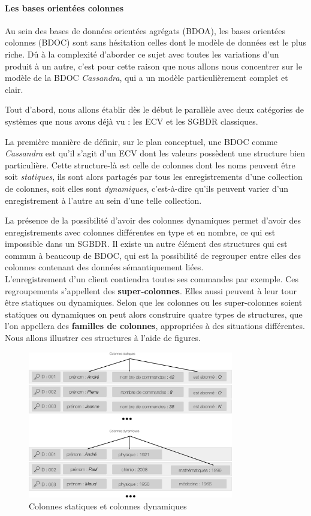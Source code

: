 \documentclass[12pt]{article}
\begin{document}
\paragraph{Les bases orientées colonnes}
Au sein des bases de données orientées agrégats (BDOA), les bases orientées colonnes (BDOC) sont sans hésitation celles dont le modèle de données est le plus riche. Dû à la complexité d'aborder ce sujet avec toutes les variations d'un produit à un autre, c'est pour cette raison que nous allons nous concentrer sur le modèle de la BDOC \emph{Cassandra}, qui a un modèle particulièrement complet et clair. \par
Tout d'abord, nous allons établir dès le début le parallèle avec deux catégories de systèmes que nous avons déjà vu : les ECV et les SGBDR classiques.
\par
La première manière de définir, sur le plan conceptuel, une BDOC comme \emph{Cassandra} est qu'il s'agit d'un ECV dont les valeurs possèdent une structure bien particulière. Cette structure-là est celle de colonnes dont les noms peuvent être soit \emph{statiques}, ils sont alors partagés par tous les enregistrements d'une collection de colonnes, soit elles sont \emph{dynamiques}, c'est-à-dire qu'ils peuvent varier d'un enregistrement à l'autre au sein d'une telle collection.
\par
La présence de la possibilité d'avoir des colonnes dynamiques permet d'avoir des enregistrements avec colonnes différentes en type et en nombre, ce qui est impossible dans un SGBDR. Il existe un autre élément des structures qui est commun à beaucoup de BDOC, qui est la possibilité de regrouper entre elles des colonnes contenant des données sémantiquement liées. \\
L'enregistrement d'un client contiendra toutes ses commandes par exemple. Ces regroupements s'appellent des \textbf{super-colonnes}. Elles aussi peuvent à leur tour être statiques ou dynamiques. Selon que les colonnes ou les super-colonnes soient statiques ou dynamiques on peut alors construire quatre types de structures, que l'on appellera des \textbf{familles de colonnes}, appropriées à des situations différentes. Nous allons illustrer ces structures à l'aide de figures.
\begin{figure}[H]
\centering
\includegraphics[width=0.8\textwidth]{colonnes}
\caption{Colonnes statiques et colonnes dynamiques}
\end{figure}
\end{document}
